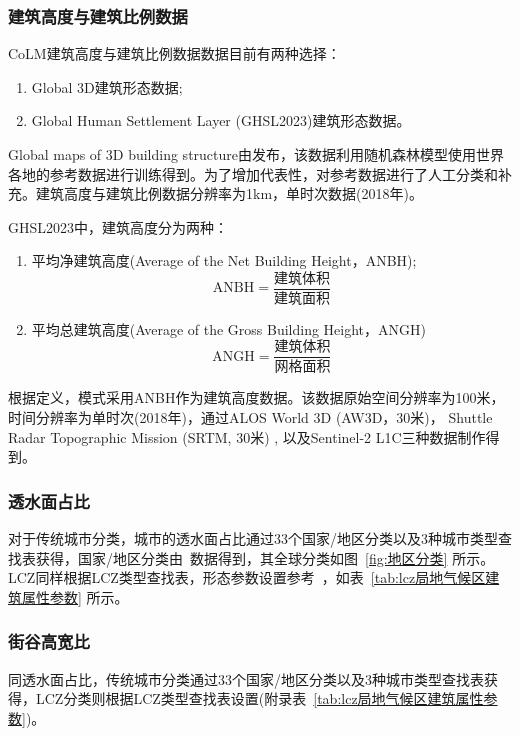 \subsubsection{建筑高度与建筑比例数据}\label{建筑高度与比例}
CoLM建筑高度与建筑比例数据数据目前有两种选择：
\begin{enumerate}
  \item Global 3D建筑形态数据;
  \item Global Human Settlement Layer (GHSL2023)建筑形态数据。
\end{enumerate}
%
Global maps of 3D building structure由\citet{li2022global}发布，该数据利用随机森林模型使用世界各地的参考数据进行训练得到。为了增加代表性，\citet{li2022global}对参考数据进行了人工分类和补充。建筑高度与建筑比例数据分辨率为1km，单时次数据(2018年)。

GHSL2023中，建筑高度分为两种：
\begin{enumerate}
  \item 平均净建筑高度(Average of the Net Building Height，ANBH);
    \begin{equation}\label{ANBH}
      \mathrm{ANBH}=\frac{\mbox{建筑体积}}{\mbox{建筑面积}}
    \end{equation}
  \item 平均总建筑高度(Average of the Gross Building Height，ANGH)
    \begin{equation}
      \mathrm{ANGH}=\frac{\mbox{建筑体积}}{\mbox{网格面积}}
    \end{equation}
\end{enumerate}
根据定义，模式采用ANBH作为建筑高度数据。该数据原始空间分辨率为100米，时间分辨率为单时次(2018年)，通过ALOS World 3D (AW3D，30米)， Shuttle Radar Topographic Mission (SRTM, 30米) , 以及Sentinel-2 L1C三种数据制作得到。
%

\subsubsection{透水面占比}\label{透水面占比}
对于传统城市分类，城市的透水面占比通过33个国家/地区分类以及3种城市类型查找表获得，国家/地区分类由~\citet{oleson2020parameterization}数据得到，其全球分类如图~\ref{fig:地区分类} 所示。
LCZ同样根据LCZ类型查找表，形态参数设置参考~\citet{stewart2014evaluation}，如表~\ref{tab:lcz局地气候区建筑属性参数} 所示。

\subsubsection{街谷高宽比}\label{街谷高宽比}
同透水面占比，传统城市分类通过33个国家/地区分类以及3种城市类型查找表获得，LCZ分类则根据LCZ类型查找表设置(附录表~\ref{tab:lcz局地气候区建筑属性参数})。

